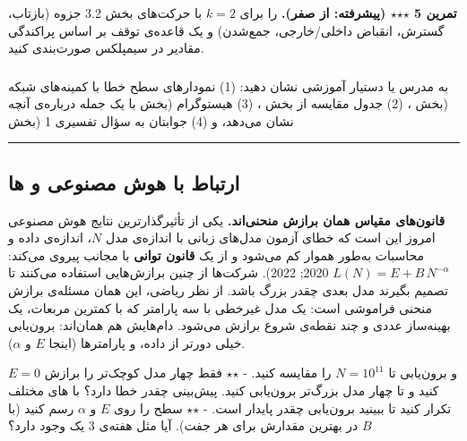 \textbf{تمرین 5 \ensuremath{\star}\ensuremath{\star}\ensuremath{\star} (پیشرفته:  از صفر).}
 را برای \(k = 2\) با حرکت‌های بخش 3.2 جزوه (بازتاب،
گسترش، انقباض داخلی/خارجی، جمع‌شدن) و یک قاعده‌ی توقف بر اساس پراکندگی
مقادیر  در سیمپلکس صورت‌بندی کنید.

\subsubsection{\texorpdfstring{}{lab check-off}}

به مدرس یا دستیار آموزشی نشان دهید: (1) نمودارهای سطح خطا با کمینه‌های
شبکه (بخش ، (2) جدول مقایسه از بخش ، (3) هیستوگرام
 (بخش  با یک جمله درباره‌ی آنچه نشان می‌دهد، و (4)
جوابتان به سؤال تفسیری 1 (بخش 

\begin{center}\rule{0.5\linewidth}{0.5pt}\end{center}

\subsection{\texorpdfstring{ارتباط با هوش مصنوعی و
ها}{ارتباط با هوش مصنوعی و LLMها}}

\textbf{قانون‌های مقیاس  همان برازش منحنی‌اند.} یکی از
تأثیرگذارترین نتایج هوش مصنوعی امروز این است که خطای آزمون  مدل‌های زبانی با اندازه‌ی مدل \(N\)، اندازه‌ی داده و محاسبات به‌طور
هموار کم می‌شود و از یک \textbf{قانون توانی} با مجانب پیروی می‌کند:
\(L(N) = E + B\,N^{-\alpha}\)  2020;  2022). شرکت‌ها از چنین برازش‌هایی استفاده می‌کنند تا تصمیم بگیرند مدل
بعدی چقدر بزرگ باشد. از نظر ریاضی، این همان مسئله‌ی برازش منحنی فراموشی
است: یک مدل غیرخطی با سه پارامتر که با کمترین مربعات، یک بهینه‌ساز عددی و
چند نقطه‌ی شروع برازش می‌شود. دام‌هایش هم همان‌اند: برون‌یابی
 خیلی دورتر از داده، و  پارامترها
(اینجا \(E\) و \(\alpha\)).

\(E = 0\)  و برون‌یابی تا \(N = 10^{11}\) را مقایسه کنید. - \ensuremath{\star}\ensuremath{\star}
فقط چهار مدل کوچک‌تر را برازش کنید و تا چهار مدل بزرگ‌تر برون‌یابی کنید.
پیش‌بینی چقدر خطا دارد؟ با های مختلف تکرار کنید تا ببینید
برون‌یابی چقدر پایدار است. - \ensuremath{\star}\ensuremath{\star} سطح  را روی \(E\) و \(\alpha\)
رسم کنید (با \(B\) در بهترین مقدارش برای هر جفت). آیا مثل  هفته‌ی
3 یک  وجود دارد؟

